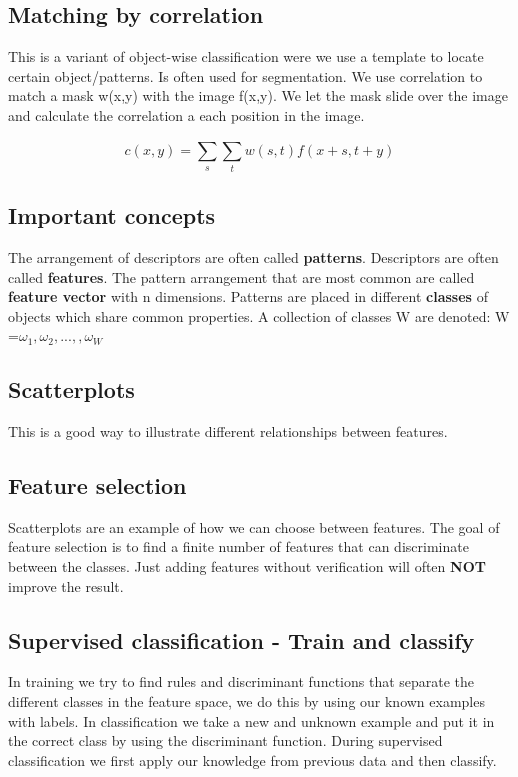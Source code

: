 \subsection*{Matching by correlation}
This is a variant of object-wise classification were we use a template to locate certain object/patterns. Is often used for segmentation. We use correlation to match a mask w(x,y) with the image f(x,y). We let the mask slide over the image and calculate the correlation a each position in the image. 

\begin{equation}
c(x,y) = \sum_{s}^{} \sum_{t}^{} w(s,t)f(x+s,t+y)
\end{equation}





\subsection*{Important concepts}
The arrangement of descriptors are often called \textbf{patterns}. Descriptors are often called \textbf{features}. The pattern arrangement that are most common are called \textbf{feature vector} with n dimensions. Patterns are placed in different \textbf{classes} of objects which share common properties. A collection of classes W are denoted: W =$\omega_1, \omega_2, ..., ,\omega_W$





\subsection*{Scatterplots}
This is a good way to illustrate different relationships between features. 





\subsection*{Feature selection}
Scatterplots are an example of how we can choose between features. The goal of feature selection is to find a finite number of features that can discriminate between the classes. Just adding features without verification will often \textbf{NOT} improve the result. 





\subsection*{Supervised classification - Train and classify}
In training we try to find rules and discriminant functions that separate the different classes in the feature space, we do this by using our known examples with labels. In classification we take a new and unknown example and put it in the correct class by using the discriminant function. During supervised classification we first apply our knowledge from previous data and then classify. 





